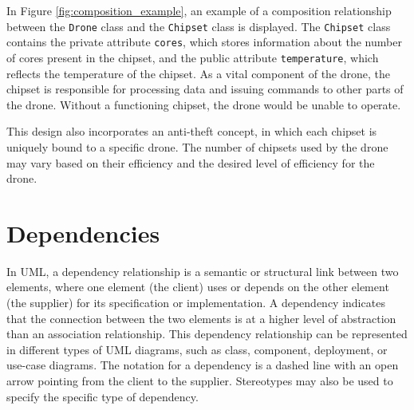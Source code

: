 \documentclass[
	12pt,
    a4paper,
    egregdoesnotlikesansseriftitles, %
    toc=chapterentrywithdots,
    oneside, openany,
    titlepage,
    parskip=half,
    headings=normal,  %
    listof=totoc,
    bibliography=totocnumbered,
    index=totoc,
    captions=tableheading,  %
    listof=flat,
    numbers=noenddot, %
    final]
    {scrbook}
\begin{document}
In Figure \ref{fig:composition_example}, an example of a composition relationship between the \texttt{Drone} class and the \texttt{Chipset} class is displayed. The \texttt{Chipset} class contains the private attribute \texttt{cores}, which stores information about the number of cores present in the chipset, and the public attribute \texttt{temperature}, which reflects the temperature of the chipset. As a vital component of the drone, the chipset is responsible for processing data and issuing commands to other parts of the drone. Without a functioning chipset, the drone would be unable to operate.

This design also incorporates an anti-theft concept, in which each chipset is uniquely bound to a specific drone. The number of chipsets used by the drone may vary based on their efficiency and the desired level of efficiency for the drone.


\chapter{Dependencies}
In UML, a dependency relationship is a semantic or structural link between two elements, where one element (the client) uses or depends on the other element (the supplier) for its specification or implementation. 
A dependency indicates that the connection between the two elements is at a higher level of abstraction than an association relationship.
This dependency relationship can be represented in different types of UML diagrams, such as class, component, deployment, or use-case diagrams. 
The notation for a dependency is a dashed line with an open arrow pointing from the client to the supplier.
Stereotypes may also be used to specify the specific type of dependency. \cite[p. 159-160]{uml}
\end{document}
